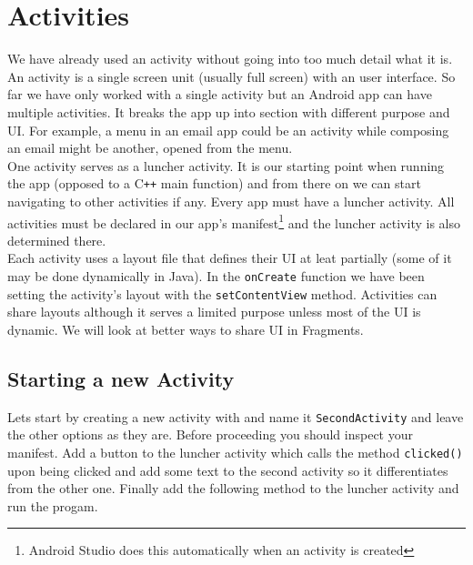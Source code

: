 \graphicspath{{./lab03/Images/}}


\maketocpage


\section{Activities}
We have already used an activity without going into too much detail what it is. An activity is a single screen unit (usually full screen) with an user interface. So far we have only worked with a single activity but an Android app can have multiple activities. It breaks the app up into section with different purpose and UI. For example, a menu in an email app could be an activity while composing an email might be another, opened from the menu.\\

One activity serves as a luncher activity. It is our starting point when running the app (opposed to a C\texttt{++} main function) and from there on we can start navigating to other activities if any. Every app must have a luncher activity. All activities must be declared in our app's manifest\footnote{Android Studio does this automatically when an activity is created} and the luncher activity is also determined there.\\

Each activity uses a layout file that defines their UI at leat partially (some of it may be done dynamically in Java). In the \texttt{onCreate} function we have been setting the activity's layout with the \texttt{setContentView} method. Activities can share layouts although it serves a limited purpose unless most of the UI is dynamic. We will look at better ways to share UI in Fragments.\\

\subsection{Starting a new Activity}
Lets start by creating a new activity with  and name it \texttt{SecondActivity} and leave the other options as they are. Before proceeding you should inspect your manifest. Add a button to the luncher activity which calls the method \texttt{clicked()} upon being clicked and add some text to the second activity so it differentiates from the other one. Finally add the following method to the luncher activity and run the progam.

